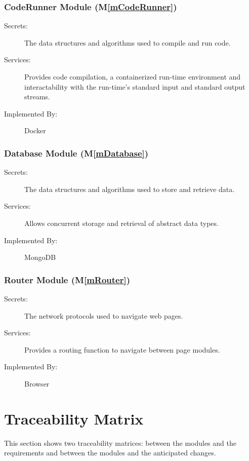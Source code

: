 \documentclass[12pt, titlepage]{article}
\newcommand{\mref}[1]{M\ref{#1}}
\begin{document}
\subsubsection{ CodeRunner Module (\mref{mCodeRunner})}
\begin{description}
\item[Secrets:] The data structures and algorithms used to compile and run code.
\item[Services:] Provides code compilation, a containerized run-time environment and interactability with the run-time's standard input and standard output streams.
\item[Implemented By:] Docker
\end{description}

\subsubsection{ Database Module (\mref{mDatabase})}
\begin{description}
\item[Secrets:] The data structures and algorithms used to store and retrieve data.
\item[Services:] Allows concurrent storage and retrieval of abstract data types.
\item[Implemented By:] MongoDB
\end{description}

\subsubsection{ Router Module (\mref{mRouter})}
\begin{description}
\item[Secrets:] The network protocols used to navigate web pages.
\item[Services:] Provides a routing function to navigate between page modules.
\item[Implemented By:] Browser
\end{description}

\section{Traceability Matrix} \label{SecTM}

This section shows two traceability matrices: between the modules and the
requirements and between the modules and the anticipated changes.
\end{document}
